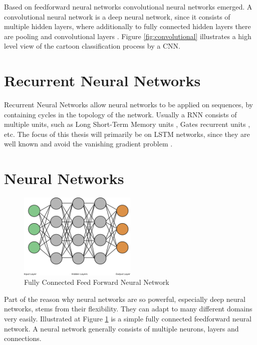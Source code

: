 \documentclass[draft,final,oneside]{vutinfth} %
\begin{document}
Based on feedforward neural networks convolutional neural networks emerged. A convolutional neural network is a deep neural network, since it consists of multiple hidden layers, where additionally to fully connected hidden layers there are pooling and convolutional layers \cite{Druzhkov2016}\cite{cnnnontech}. Figure \ref{fig:convolutional} illustrates a high level view of the cartoon classification process by a CNN.

\section{Recurrent Neural Networks}

Recurrent Neural Networks allow neural networks to be applied on sequences, by containing cycles in the topology of the network. Usually a RNN consists of multiple units, such as Long Short-Term Memory units \cite{hochreiter}, Gates recurrent units \cite{gru}, etc. The focus of this thesis will primarily be on LSTM networks, since they are well known and avoid the vanishing gradient problem \cite {vanishinggradient}.


\iffalse
\section{Neural Networks}

\begin{figure}[ht]
	\centering
  	\includegraphics[width=0.5\textwidth]{graphics/simple_neural_network.png}
	\caption{Fully Connected Feed Forward Neural Network}
	\label{fig:feedforward}
\end{figure}

Part of the reason why neural networks are so powerful, especially deep neural networks, stems from their flexibility. They can adapt to many different domains very easily. Illustrated at Figure \ref{fig:feedforward} is a simple fully connected feedforward neural network. A neural network generally consists of multiple neurons, layers and connections. \\
\end{document}
